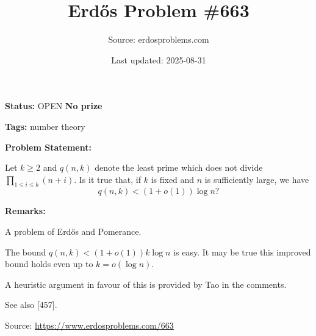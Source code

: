 \documentclass{article}
\title{Erd\H{o}s Problem \#663}
\date{Last updated: 2025-08-31}
\author{Source: erdosproblems.com}
\begin{document}
\maketitle

\noindent\textbf{Status:} OPEN \quad \textbf{No prize}

\noindent\textbf{Tags:} number theory

\medskip
\noindent\textbf{Problem Statement:}

Let $k\geq 2$ and $q(n,k)$ denote the least prime which does not divide $\prod_{1\leq i\leq k}(n+i)$. Is it true that, if $k$ is fixed and $n$ is sufficiently large, we have\[q(n,k)<(1+o(1))\log n?\]

\bigskip
\noindent\textbf{Remarks:}

A problem of Erd\H{o}s and Pomerance.

The bound $q(n,k)<(1+o(1))k\log n$ is easy. It may be true this improved bound holds even up to $k=o(\log n)$. 

A heuristic argument in favour of this is provided by Tao in the comments. 

See also [457].

\bigskip
\noindent\small{Source: \url{https://www.erdosproblems.com/663}}
\end{document}
